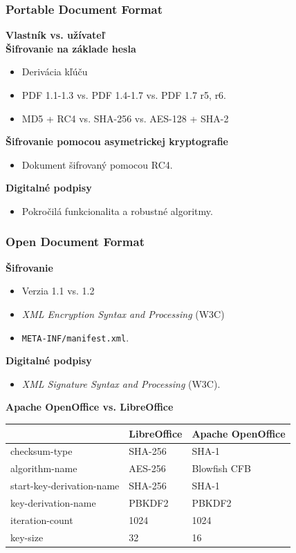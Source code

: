 \documentclass[xcolor=dvipsnames]{beamer}
\def\itemtitle#1{{\bfseries#1\smallskip}}
\begin{document}
\begin{frame}
	\frametitle{Portable Document Format}
	\itemtitle{Vlastník vs. užívateľ} \\
	\bigskip
	\itemtitle{Šifrovanie na základe hesla}
	\begin{itemize}
		\item Derivácia kľúču 
		\item PDF 1.1-1.3 vs. PDF 1.4-1.7 vs. PDF 1.7 r5, r6.
		\item MD5 + RC4 vs. SHA-256 vs. AES-128 + SHA-2
	\end{itemize}
	\bigskip
	\itemtitle{Šifrovanie pomocou asymetrickej kryptografie}
	\begin{itemize}
		\item Dokument šifrovaný pomocou RC4.	
	\end{itemize}
	\bigskip
	\itemtitle{Digitalné podpisy}
	\begin{itemize}
		\item Pokročilá funkcionalita a robustné algoritmy.
	\end{itemize}	

\end{frame}


\begin{frame}
	\frametitle{Open Document Format}
	\itemtitle{Šifrovanie}
	\begin{itemize}
		\item Verzia 1.1 vs. 1.2
		\item \textit{XML Encryption Syntax and Processing} (W3C)
		\item \texttt{META-INF/manifest.xml}.
	\end{itemize}
	\itemtitle{Digitalné podpisy}
	\begin{itemize}
		\item  \textit{XML Signature Syntax and Processing} (W3C).
	\end{itemize}
	\bigskip
	\itemtitle{Apache OpenOffice vs. LibreOffice}
	\begin{table}[h]
	\centering
	\begin{tabular}{|l|l|l|}
               \hline
		&\textbf{LibreOffice}&\textbf{Apache OpenOffice}\\
	\hline
		checksum-type&SHA-256&SHA-1\\
	\hline
		algorithm-name&AES-256&Blowfish CFB\\
	\hline
		start-key-derivation-name&SHA-256&SHA-1\\
		key-derivation-name&PBKDF2&PBKDF2\\
		iteration-count&1024&1024\\
		key-size&32&16\\
	\hline
           \end{tabular}
	\end{table}

\end{frame}
\end{document}
